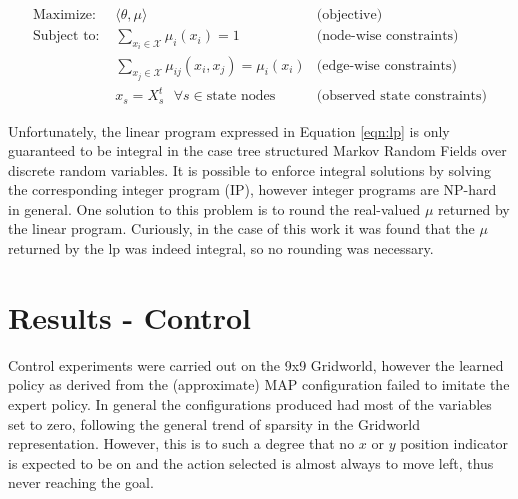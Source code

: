 \documentclass{article} %
\begin{document}
\begin{equation}
\begin{array}{llr}
\textrm{Maximize: } & \langle \theta, \mu \rangle & \textrm{(objective)}\\
\textrm{Subject to: } & \sum_{x_i \in \mathcal{X}} \mu_i(x_i) = 1 & \textrm{(node-wise constraints)}\\
& \sum_{x_j \in \mathcal{X}} \mu_{ij}(x_i,x_j) = \mu_i(x_i) & \textrm{(edge-wise constraints)}\\
& x_s = X_s^t \textrm{ } \forall s \in \textrm{state nodes} & \textrm{(observed state constraints)}
\end{array}
\label{eqn:lp}
\end{equation}

Unfortunately, the linear program expressed in Equation \ref{eqn:lp} is only
guaranteed to be integral in the case tree structured Markov Random Fields over
discrete random variables. It is possible to enforce integral solutions by
solving the corresponding integer program (IP), however integer programs are
NP-hard in general. One solution to this problem is to round the real-valued
$\mu$ returned by the linear program. Curiously, in the case of this work it
was found that the $\mu$ returned by the lp was indeed integral, so no rounding
was necessary.


\section{Results - Control}
Control experiments were carried out on the 9x9 Gridworld, however the learned
policy as derived from the (approximate) MAP configuration failed to imitate the
expert policy. In general the configurations produced had most of the variables
set to zero, following the general trend of sparsity in the Gridworld 
representation. However, this is to such a degree that no $x$ or $y$ position
indicator is expected to be on and the action selected is almost always to move 
left, thus never reaching the goal.
\end{document}
